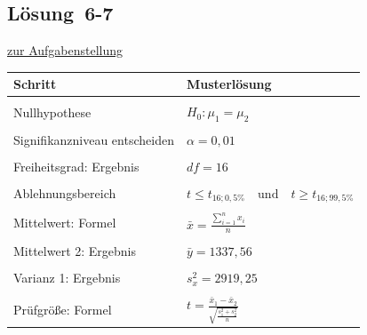 \documentclass[
  11pt,
  ngerman,
  a4paper,
]{report}
\begin{document}
\hypertarget{loesung-6-7}{%
\subsection{Lösung~6-7}\label{loesung-6-7}}

\protect\hyperlink{aufgabe-6-7}{zur Aufgabenstellung}

\begin{table}[H]
\centering
\begin{tabular}{>{\raggedright\arraybackslash}p{8cm}>{\raggedright\arraybackslash}p{8cm}}
\toprule
\textbf{Schritt} & \textbf{Musterlösung}\\
\midrule
\cellcolor{gray!6}{Test wählen} & \cellcolor{gray!6}{2-Stichproben-$t$-Test}\\
Nullhypothese & $H_0: \mu_1 = \mu_2$\\
\cellcolor{gray!6}{Alternativhypothese} & \cellcolor{gray!6}{$H_1: \mu_1 \neq \mu_2$}\\
Signifikanzniveau entscheiden & $\alpha=0,01$\\
\cellcolor{gray!6}{Freiheitsgrad: Formel} & \cellcolor{gray!6}{$\mathit{df} = 2\cdot n - 2$}\\
Freiheitsgrad: Ergebnis & $\mathit{df} = 16$\\
\cellcolor{gray!6}{Ablehnungsbereich: Formel} & \cellcolor{gray!6}{$t \leq t_{\mathit{df};\alpha/2} \quad \textrm{und} \quad t \geq t_{\mathit{df};(1-\alpha/2)}$}\\
Ablehnungsbereich & $t \leq t_{16;0{,}5\%} \quad \textrm{und} \quad t \geq t_{16;99{,}5\%}$\\
\cellcolor{gray!6}{Ablehnungsbereich} & \cellcolor{gray!6}{$t \leq-2{,}921\quad \textrm{und} \quad t \geq2{,}921$}\\
Mittelwert: Formel & $\bar{x}=\frac{\sum\limits_{i=1}^{n}x_{i}}{n}$\\
\cellcolor{gray!6}{Mittelwert 1: Ergebnis} & \cellcolor{gray!6}{$\bar{x}=1186$}\\
Mittelwert 2: Ergebnis & $\bar{y}=1337{,}56$\\
\cellcolor{gray!6}{Varianz: Formel} & \cellcolor{gray!6}{$s^2=\frac{\sum\limits_{i=1}^{n}(x_{i}-\bar{x})^2}{n-1}$}\\
Varianz 1: Ergebnis & $s^2_x=2919{,}25$\\
\cellcolor{gray!6}{Varianz 2: Ergebnis} & \cellcolor{gray!6}{$s^2_y=53274{,}52$}\\
Prüfgröße: Formel & $t=\frac{\bar{x}_1-\bar{x}_2}{\sqrt{\frac{s^2_1+s^2_2}{n}}}$\\

\end{tabular}
\end{table}
\end{document}
